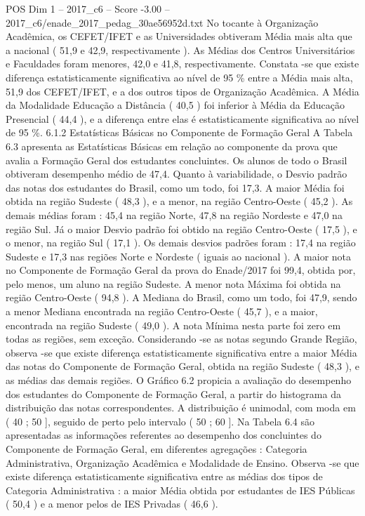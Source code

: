 \begin{textsample}{POS Dim 1 – 2017\_c6 – Score -3.00 – 2017\_c6/enade\_2017\_pedag\_30ae56952d.txt}
No tocante à Organização Acadêmica, os CEFET/IFET e as Universidades obtiveram Média mais alta que a nacional ( 51,9 e 42,9, respectivamente ).
As Médias dos Centros Universitários e Faculdades foram menores, 42,0 e 41,8, respectivamente.
Constata -se que existe diferença estatisticamente significativa ao nível de 95 \% entre a Média mais alta, 51,9 dos CEFET/IFET, e a dos outros tipos de Organização Acadêmica.
A Média da Modalidade Educação a Distância ( 40,5 ) foi inferior à Média da Educação Presencial ( 44,4 ), e a diferença entre elas é estatisticamente significativa ao nível de 95 \%. 6.1.2 Estatísticas Básicas no Componente de Formação Geral A Tabela 6.3 apresenta as Estatísticas Básicas em relação ao componente da prova que avalia a Formação Geral dos estudantes concluintes.
Os alunos de todo o Brasil obtiveram desempenho médio de 47,4.
Quanto à variabilidade, o Desvio padrão das notas dos estudantes do Brasil, como um todo, foi 17,3.
A maior Média foi obtida na região Sudeste ( 48,3 ), e a menor, na região Centro-Oeste ( 45,2 ).
As demais médias foram : 45,4 na região Norte, 47,8 na região Nordeste e 47,0 na região Sul.
Já o maior Desvio padrão foi obtido na região Centro-Oeste ( 17,5 ), e o menor, na região Sul ( 17,1 ).
Os demais desvios padrões foram : 17,4 na região Sudeste e 17,3 nas regiões Norte e Nordeste ( iguais ao nacional ).
A maior nota no Componente de Formação Geral da prova do Enade/2017 foi 99,4, obtida por, pelo menos, um aluno na região Sudeste.
A menor nota Máxima foi obtida na região Centro-Oeste ( 94,8 ).
A Mediana do Brasil, como um todo, foi 47,9, sendo a menor Mediana encontrada na região Centro-Oeste ( 45,7 ), e a maior, encontrada na região Sudeste ( 49,0 ).
A nota Mínima nesta parte foi zero em todas as regiões, sem exceção.
Considerando -se as notas segundo Grande Região, observa -se que existe diferença estatisticamente significativa entre a maior Média das notas do Componente de Formação Geral, obtida na região Sudeste ( 48,3 ), e as médias das demais regiões.
O Gráfico 6.2 propicia a avaliação do desempenho dos estudantes do Componente de Formação Geral, a partir do histograma da distribuição das notas correspondentes.
A distribuição é unimodal, com moda em ( 40 ; 50 ], seguido de perto pelo intervalo ( 50 ; 60 ].
Na Tabela 6.4 são apresentadas as informações referentes ao desempenho dos concluintes do Componente de Formação Geral, em diferentes agregações : Categoria Administrativa, Organização Acadêmica e Modalidade de Ensino.
Observa -se que existe diferença estatisticamente significativa entre as médias dos tipos de Categoria Administrativa : a maior Média obtida por estudantes de IES Públicas ( 50,4 ) e a menor pelos de IES Privadas ( 46,6 ).

\end{textsample}
